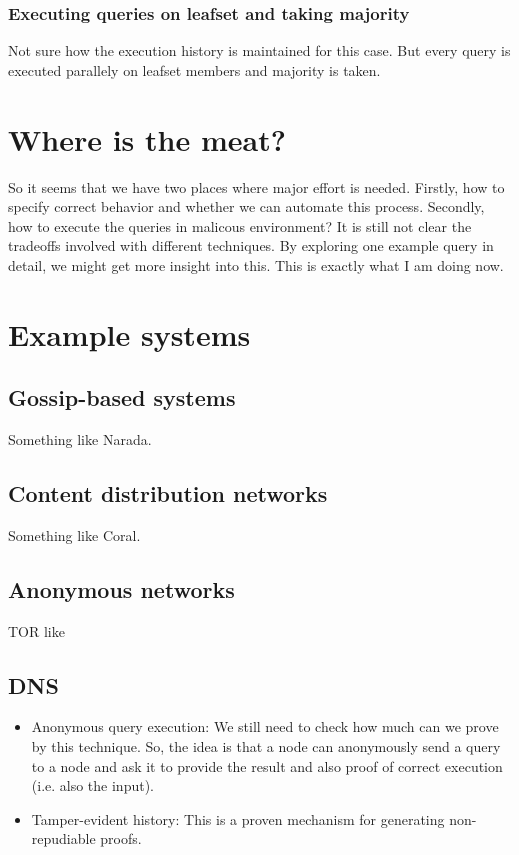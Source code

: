 \subsubsection{Executing queries on leafset and taking majority} 
Not sure how the execution history is maintained for this case. But 
every query is executed parallely on leafset members and majority is 
taken.  
 
\section{Where is the meat?} 
So it seems that we have two places where major effort is 
needed. Firstly, how to specify correct behavior and whether we can 
automate this process. Secondly, how to execute the queries in 
malicous environment? It is still not clear the tradeoffs involved 
with different techniques. By exploring one example query in detail, 
we might get more insight into this. This is exactly what I am doing now. 
 
 
\section{Example systems} 
 
\subsection{Gossip-based systems} 
Something like Narada. 
 
\subsection{Content distribution networks} 
Something like Coral. 
 
\subsection{Anonymous networks} 
TOR like 
 
\subsection{DNS} 
 
 
 
 
\begin{itemize} 
\item{Anonymous query execution:} We still need to check how much can 
  we prove by this technique. So, the idea is that a node can 
  anonymously send a query to a node and ask it to provide the result 
  and also proof of correct execution (i.e. also the input).  
\item{Tamper-evident history:} This is a proven mechanism for 
  generating non-repudiable proofs.  
\end{itemize} 
 
